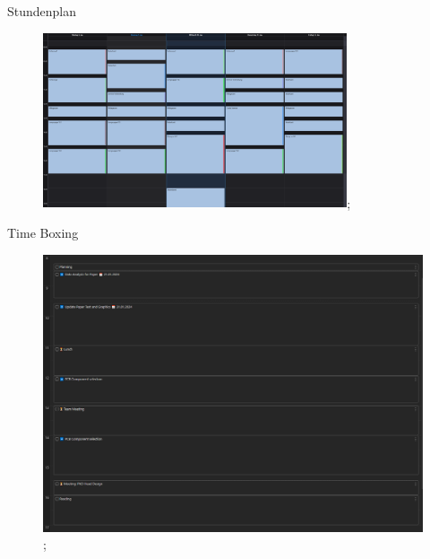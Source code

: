 \begin{frame}{Stundenplan}
    \begin{figure}
       \includegraphics[width=0.8\textwidth]{graphics/Kalender/Kalender5.PNG};
    \end{figure}
\end{frame}

\begin{frame}{Time Boxing}    
    \begin{figure}
       \includegraphics[height=0.8\textheight,trim={0 0 10cm 0},clip]{graphics/MyDailyPlan.png};
    \end{figure}
\end{frame}

